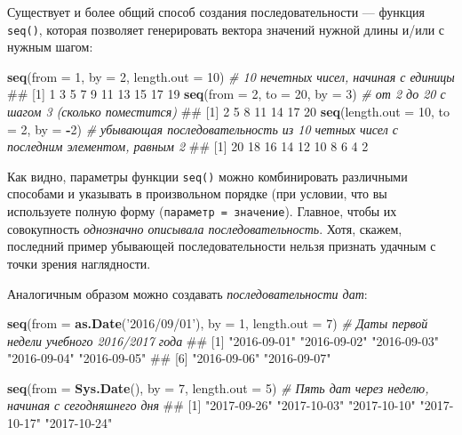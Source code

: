 \documentclass[]{book}
\newenvironment{Shaded}{\begin{snugshade}}{\end{snugshade}}
\newcommand{\KeywordTok}[1]{\textcolor[rgb]{0.13,0.29,0.53}{\textbf{#1}}}
\newcommand{\DataTypeTok}[1]{\textcolor[rgb]{0.13,0.29,0.53}{#1}}
\newcommand{\DecValTok}[1]{\textcolor[rgb]{0.00,0.00,0.81}{#1}}
\newcommand{\StringTok}[1]{\textcolor[rgb]{0.31,0.60,0.02}{#1}}
\newcommand{\CommentTok}[1]{\textcolor[rgb]{0.56,0.35,0.01}{\textit{#1}}}
\newcommand{\OperatorTok}[1]{\textcolor[rgb]{0.81,0.36,0.00}{\textbf{#1}}}
\newcommand{\NormalTok}[1]{#1}
\begin{document}
Существует и более общий способ создания последовательности --- функция
\texttt{seq()}, которая позволяет генерировать вектора значений нужной
длины и/или с нужным шагом:

\begin{Shaded}
\begin{Highlighting}[]
\KeywordTok{seq}\NormalTok{(}\DataTypeTok{from =} \DecValTok{1}\NormalTok{, }\DataTypeTok{by =} \DecValTok{2}\NormalTok{, }\DataTypeTok{length.out =} \DecValTok{10}\NormalTok{) }\CommentTok{# 10 нечетных чисел, начиная с единицы}
\NormalTok{##  [1]  1  3  5  7  9 11 13 15 17 19}
\KeywordTok{seq}\NormalTok{(}\DataTypeTok{from =} \DecValTok{2}\NormalTok{, }\DataTypeTok{to =} \DecValTok{20}\NormalTok{, }\DataTypeTok{by =} \DecValTok{3}\NormalTok{) }\CommentTok{# от 2 до 20 с шагом 3 (сколько поместится)}
\NormalTok{## [1]  2  5  8 11 14 17 20}
\KeywordTok{seq}\NormalTok{(}\DataTypeTok{length.out =} \DecValTok{10}\NormalTok{, }\DataTypeTok{to =} \DecValTok{2}\NormalTok{, }\DataTypeTok{by =} \OperatorTok{-}\DecValTok{2}\NormalTok{) }\CommentTok{# убывающая последовательность из 10 четных чисел с последним элементом, равным 2}
\NormalTok{##  [1] 20 18 16 14 12 10  8  6  4  2}
\end{Highlighting}
\end{Shaded}

Как видно, параметры функции \texttt{seq()} можно комбинировать
различными способами и указывать в произвольном порядке (при условии,
что вы используете полную форму (\texttt{параметр\ =\ значение}).
Главное, чтобы их совокупность \emph{однозначно описывала
последовательность}. Хотя, скажем, последний пример убывающей
последовательности нельзя признать удачным с точки зрения наглядности.

Аналогичным образом можно создавать \emph{последовательности дат}:

\begin{Shaded}
\begin{Highlighting}[]
\KeywordTok{seq}\NormalTok{(}\DataTypeTok{from =} \KeywordTok{as.Date}\NormalTok{(}\StringTok{'2016/09/01'}\NormalTok{), }\DataTypeTok{by =} \DecValTok{1}\NormalTok{, }\DataTypeTok{length.out =} \DecValTok{7}\NormalTok{) }\CommentTok{# Даты первой недели учебного 2016/2017 года}
\NormalTok{## [1] "2016-09-01" "2016-09-02" "2016-09-03" "2016-09-04" "2016-09-05"}
\NormalTok{## [6] "2016-09-06" "2016-09-07"}

\KeywordTok{seq}\NormalTok{(}\DataTypeTok{from =} \KeywordTok{Sys.Date}\NormalTok{(), }\DataTypeTok{by =} \DecValTok{7}\NormalTok{, }\DataTypeTok{length.out =} \DecValTok{5}\NormalTok{) }\CommentTok{# Пять дат через неделю, начиная с сегодняшнего дня}
\NormalTok{## [1] "2017-09-26" "2017-10-03" "2017-10-10" "2017-10-17" "2017-10-24"}
\end{Highlighting}
\end{Shaded}
\end{document}
